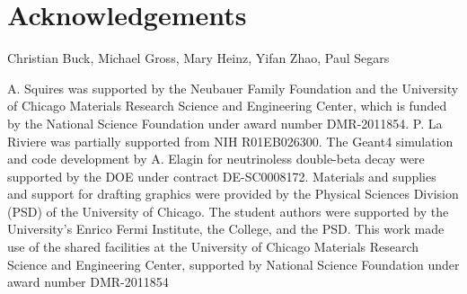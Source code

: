 \documentclass[12pt]{article}
\begin{document}
\clearpage

 \section{Acknowledgements}
Christian Buck, Michael Gross, Mary Heinz, Yifan Zhao, Paul Segars

A. Squires was supported by the Neubauer Family Foundation and the
University of Chicago Materials Research Science and Engineering
Center, which is funded by the National Science Foundation under award
number DMR-2011854. P. La Riviere was partially supported from NIH
R01EB026300. The Geant4 simulation and code development by A. Elagin
for neutrinoless double-beta decay were supported by the DOE under
contract DE-SC0008172. Materials and supplies and support for drafting
graphics were provided by the Physical Sciences Division (PSD) of the
University of Chicago. The student authors were supported by the
University's Enrico Fermi Institute, the College, and the PSD. This
work made use of the shared facilities at the University of Chicago
Materials Research Science and Engineering Center, supported by
National Science Foundation under award number DMR-2011854
\end{document}
